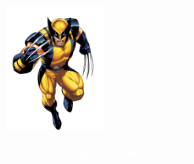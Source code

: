 \documentclass[12pt]{article}
\begin{document}
\newpage
{}

\hypertarget{wolverine}{}

\begin{center}
    \vspace*{2cm}
    \includegraphics[width=0.25\textwidth]{wolverine.png}
    \vspace{0.5cm}

    {\Huge \textbf{\textcolor{white}{Wolverine Highlights and Events}}}
\end{center}

\vspace{0.5cm}
\end{document}
